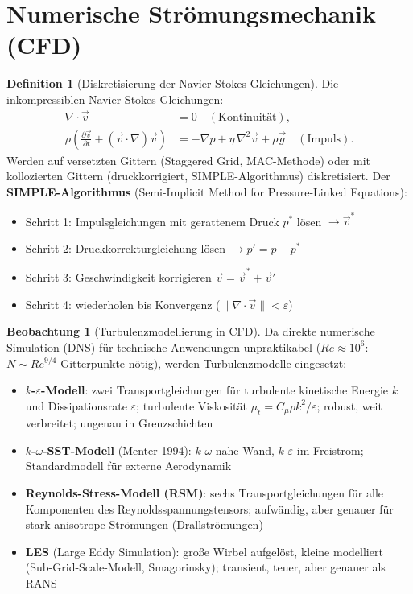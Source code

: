 ﻿\documentclass[a4paper,12pt]{report}
\theoremstyle{definition}
\newtheorem{definition}{Definition}
\newtheorem{beobachtung}{Beobachtung}
\begin{document}
\section{Numerische Strömungsmechanik (CFD)}

\begin{definition}[Diskretisierung der Navier-Stokes-Gleichungen]
Die inkompressiblen Navier-Stokes-Gleichungen:
\begin{align*}
  \nabla\cdot\vec{v} &= 0 \quad (\text{Kontinuität}),\\
  \rho\left(\frac{\partial\vec{v}}{\partial t} + (\vec{v}\cdot\nabla)\vec{v}\right)
  &= -\nabla p + \eta\,\nabla^2\vec{v} + \rho\vec{g} \quad (\text{Impuls}).
\end{align*}
Werden auf versetzten Gittern (Staggered Grid, MAC-Methode) oder
mit kollozierten Gittern (druckkorrigiert, SIMPLE-Algorithmus) diskretisiert.
Der \textbf{SIMPLE-Algorithmus} (Semi-Implicit Method for Pressure-Linked Equations):
\begin{itemize}
    \item[-] Schritt 1: Impulsgleichungen mit gerattenem Druck $p^*$ lösen $\to \vec{v}^*$
    \item[-] Schritt 2: Druckkorrekturgleichung lösen $\to p' = p - p^*$
    \item[-] Schritt 3: Geschwindigkeit korrigieren $\vec{v} = \vec{v}^* + \vec{v}'$
    \item[-] Schritt 4: wiederholen bis Konvergenz ($\|\nabla\cdot\vec{v}\| < \varepsilon$)
\end{itemize}
\end{definition}

\begin{beobachtung}[Turbulenzmodellierung in CFD]
Da direkte numerische Simulation (DNS) für technische Anwendungen unpraktikabel
($Re \approx 10^6$: $N \sim Re^{9/4}$ Gitterpunkte nötig), werden Turbulenzmodelle eingesetzt:
\begin{itemize}
    \item[-] \textbf{$k$-$\varepsilon$-Modell}: zwei Transportgleichungen für
          turbulente kinetische Energie $k$ und Dissipationsrate $\varepsilon$;
          turbulente Viskosität $\mu_t = C_\mu\rho k^2/\varepsilon$;
          robust, weit verbreitet; ungenau in Grenzschichten
    \item[-] \textbf{$k$-$\omega$-SST-Modell} (Menter 1994): $k$-$\omega$ nahe Wand,
          $k$-$\varepsilon$ im Freistrom; Standardmodell für externe Aerodynamik
    \item[-] \textbf{Reynolds-Stress-Modell (RSM)}: sechs Transportgleichungen
          für alle Komponenten des Reynoldsspannungstensors; aufwändig,
          aber genauer für stark anisotrope Strömungen (Drallströmungen)
    \item[-] \textbf{LES} (Large Eddy Simulation): große Wirbel aufgelöst,
          kleine modelliert (Sub-Grid-Scale-Modell, Smagorinsky);
          transient, teuer, aber genauer als RANS
\end{itemize}
\end{beobachtung}
\end{document}
